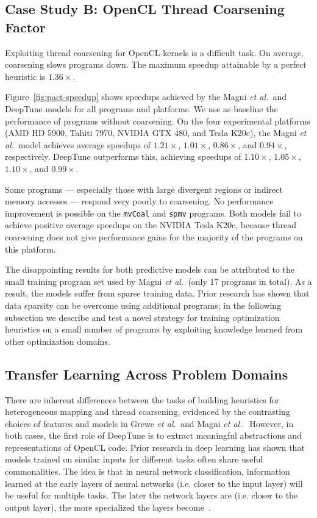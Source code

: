 



\subsection{Case Study B: OpenCL Thread Coarsening Factor}



Exploiting thread coarsening for OpenCL kernels is a difficult task. On average,
coarsening slows programs down. The maximum speedup attainable by a perfect
heuristic is $1.36\times$.

Figure~\ref{fig:pact-speedup} shows speedups achieved by the Magni \emph{et al.\
}and DeepTune models for all programs and platforms. We use as baseline the
performance of programs without coarsening.  On the four experimental platforms
(AMD HD 5900, Tahiti 7970, NVIDIA GTX 480, and Tesla K20c), the Magni \emph{et
al.\ }model achieves average speedups of $1.21\times$, $1.01\times$,
$0.86\times$, and $0.94\times$, respectively. DeepTune outperforms this,
achieving speedups of $1.10\times$, $1.05\times$, $1.10\times$, and
$0.99\times$.

Some programs --- especially those with large divergent regions or indirect
memory accesses --- respond very poorly to coarsening. No performance
improvement is possible on the \texttt{mvCoal} and \texttt{spmv} programs. Both
models fail to achieve positive average speedups on the NVIDIA Tesla K20c,
because thread coarsening does not give performance gains for the majority of
the programs on this platform.

The disappointing results for both predictive models can be attributed to the
small training program set used by Magni \emph{et al.\ }(only 17 programs in
total). As a result, the models suffer from sparse training data. Prior research
has shown that data sparsity can be overcome using additional programs; in the
following subsection we describe and test a novel strategy for training
optimization heuristics on a small number of programs by exploiting knowledge
learned from other optimization domains.


\subsection{Transfer Learning Across Problem Domains}\label{subsec:tl}

There are inherent differences between the tasks of building heuristics for
heterogeneous mapping and thread coarsening, evidenced by the contrasting
choices of features and models in Grewe \emph{et al.\ }and Magni \emph{et al.\ }
However, in both cases, the first role of DeepTune is to extract meaningful
abstractions and representations of OpenCL code. Prior research in deep learning
has shown that models trained on similar inputs for different tasks often share
useful commonalities. The idea is that in neural network classification,
information learned at the early layers of neural networks (i.e. closer to the
input layer) will be useful for multiple tasks. The later the network layers are
(i.e. closer to the output layer), the more specialized the layers
become~\cite{Zeiler2014}.

